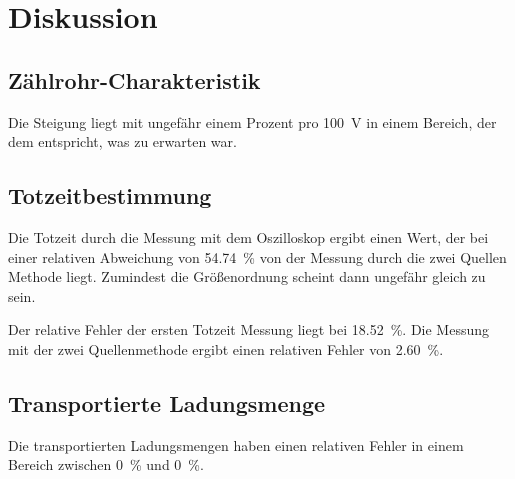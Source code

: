 \section{Diskussion}
\label{sec:Diskussion}

\subsection{Zählrohr-Charakteristik}

Die Steigung liegt mit ungefähr einem Prozent pro \SI{100}{\volt} in einem Bereich, der dem entspricht, was zu erwarten war. %

\subsection{Totzeitbestimmung}

Die Totzeit durch die Messung mit dem Oszilloskop ergibt einen Wert, der bei einer relativen Abweichung von \SI{54.74}{\percent} von der Messung durch die zwei Quellen Methode liegt. 
Zumindest die Größenordnung scheint dann ungefähr gleich zu sein. 

Der relative Fehler der ersten Totzeit Messung liegt bei \SI{18.52}{\percent}. Die Messung mit der zwei Quellenmethode ergibt einen relativen Fehler von \SI{2.60}{\percent}. 

\subsection{Transportierte Ladungsmenge}

Die transportierten Ladungsmengen haben einen relativen Fehler in einem Bereich zwischen \SI{0}{\percent} und \SI{0}{\percent}.
